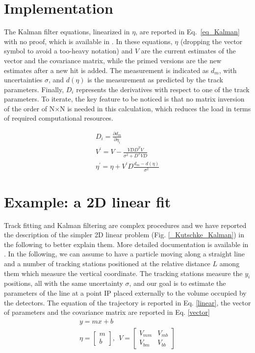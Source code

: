 \begin{refsection}
\section{Implementation}
    The Kalman filter equations, linearized in $\eta$, are reported in Eq.~\ref{eq_Kalman} with no proof, which is available in \cite{KutschkePaper}. 
    In these equations, $\eta$ (dropping the vector symbol to avoid a too-heavy notation) and $V$ are the current estimates of the vector and the covariance matrix, while the primed versions are the new estimates after a new hit is added. 
    The measurement is indicated as $d_m$, with uncertainties $\sigma$, and $d(\eta)$ is the measurement as predicted by the track parameters. 
    Finally, $D_i$ represents the derivatives with respect to one of the track parameters. 
    To iterate, the key feature to be noticed is that no matrix inversion of the order of N$\times$N is needed in this calculation, which reduces the load in terms of required computational resources.

    \begin{equation}
        \begin{gathered}
            D_i = \frac{\partial d_m}{\partial \eta_i} \\
            V^\prime = V - \frac{VDD^TV}{\sigma^2+D^TVD}\\
            \eta^\prime = \eta + V^\prime D \frac{d_m-d(\eta)}{\sigma^2}
        \end{gathered} 
        \label{eq_Kalman}
    \end{equation}

\section{Example: a 2D linear fit}
    \label{2Dfit}
    Track fitting and Kalman filtering are complex procedures and we have reported the description of the simpler 2D linear problem (Fig. \ref{_Kutschke_Kalman}) in the following to better explain them. 
    More detailed documentation is available in \cite{Kutschke} \cite{KutschkePaper}. 
    In the following, we can assume to have a particle moving along a straight line and a number of tracking stations positioned at the relative distance $L$ among them which measure the vertical coordinate.
    The tracking stations measure the $y_i$ positions, all with the same uncertainty $\sigma$, and our goal is to estimate the parameters of the line at a point IP placed externally to the volume occupied by the detectors.
    The equation of the trajectory is reported in Eq. \ref{linear}, the vector of parameters and the covariance matrix are reported in Eq. \ref{vector}
    \begin{gather}
        y = mx +b \label{linear}\\
        \eta = \begin{bmatrix} m \\  b \end{bmatrix},\ \ V=\begin{bmatrix} V_{mm}& V_{mb} \\ V_{bm}& V_{bb} \end{bmatrix} \label{vector}
    \end{gather}  


\end{refsection}
